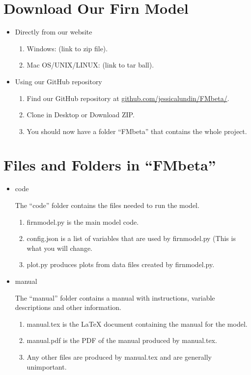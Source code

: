 \documentclass{article}
\begin{document}
\section{Download Our Firn Model}

\begin{itemize}
  \item Directly from our website
  \begin{enumerate}
    \item Windows: (link to zip file).
    \item Mac OS/UNIX/LINUX: (link to tar ball).
  \end{enumerate}

  \item Using our GitHub repository 
  \begin{enumerate}
    \item Find our GitHub repository at \href{https://github.com/jessicalundin/FMbeta/}{github.com/jessicalundin/FMbeta/}.
    \item Clone in Desktop or Download ZIP.
    \item You should now have a folder ``FMbeta'' that contains the whole project.
  \end{enumerate}
\end{itemize}

\section{Files and Folders in ``FMbeta''}
\begin{itemize}
  \item code

  The ``code'' folder contains the files needed to run the model.
  \begin{enumerate}
    \item firnmodel.py is the main model code.
    \item config.json is a list of variables that are used by firnmodel.py (This is what you will change.
    \item plot.py produces plots from data files created by firnmodel.py.
  \end{enumerate}
  \item manual

  The ``manual'' folder contains a manual with instructions, variable descriptions and other information.
  \begin{enumerate} 
    \item manual.tex is the LaTeX document containing the manual for the model.
    \item manual.pdf is the PDF of the manual produced by manual.tex.
    \item Any other files are produced by manual.tex and are generally unimportant.
    
  \end{enumerate}
\end{itemize}
\end{document}
